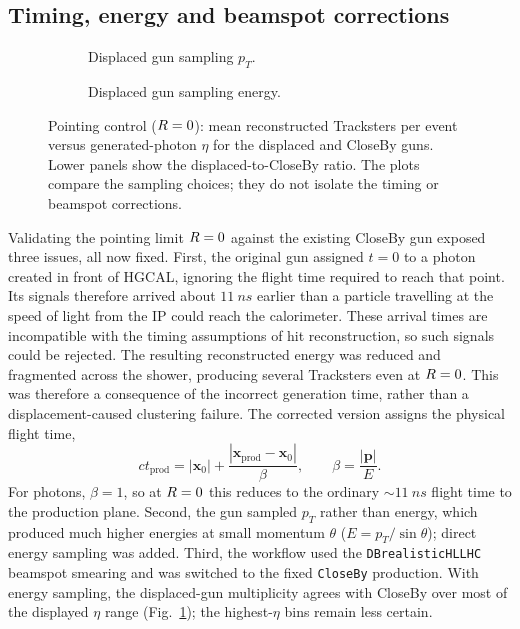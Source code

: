 \subsection{Timing, energy and beamspot corrections}

\begin{figure}[!tp]
  \centering
  \begin{subfigure}[t]{0.49\textwidth}
    \caption{Displaced gun sampling $p_T$.}
  \end{subfigure}\hfill
  \begin{subfigure}[t]{0.49\textwidth}
    \caption{Displaced gun sampling energy.}
  \end{subfigure}
  \caption{Pointing control ($R=0$): mean reconstructed Tracksters per event
  versus generated-photon $\eta$ for the displaced and CloseBy guns. Lower panels
  show the displaced-to-CloseBy ratio. The plots compare the sampling choices;
  they do not isolate the timing or beamspot corrections.}
  \label{fig:guncomparison}
\end{figure}

Validating the pointing limit $R=0$ against the existing CloseBy gun exposed three issues, all now fixed. First, the original gun assigned $t=0$ to a photon created in front of
HGCAL, ignoring the flight time required to reach that point. Its signals
therefore arrived about $\SI{11}{ns}$ earlier than a particle travelling at the
speed of light from the IP could reach the calorimeter. These arrival times are
incompatible with the timing assumptions of hit reconstruction, so such
signals could be rejected. The resulting reconstructed energy was reduced and
fragmented across the shower, producing several Tracksters even at $R=0$.
This was therefore a consequence of the incorrect generation time, rather than
a displacement-caused clustering failure. The corrected version assigns the
physical flight time,
\begin{equation}
  ct_{\mathrm{prod}}=|\mathbf{x}_0|
       +\frac{|\mathbf{x}_{\mathrm{prod}}-\mathbf{x}_0|}{\beta},
  \qquad \beta=\frac{|\mathbf{p}|}{E}.
  \label{eq:guntime}
\end{equation}
For photons, $\beta=1$, so at $R=0$ this reduces to the ordinary
$\sim\SI{11}{ns}$ flight time to the production plane.
Second, the gun sampled $p_T$ rather than energy, which produced much higher
energies at small momentum $\theta$ ($E=p_T/\sin\theta$); direct energy sampling
was added. Third, the workflow used the
\texttt{DBrealisticHLLHC} beamspot smearing and was switched to the fixed \texttt{CloseBy} production.
With energy sampling, the displaced-gun multiplicity agrees with CloseBy over
most of the displayed $\eta$ range (Fig.~\ref{fig:guncomparison}); the
highest-$\eta$ bins remain less certain.

